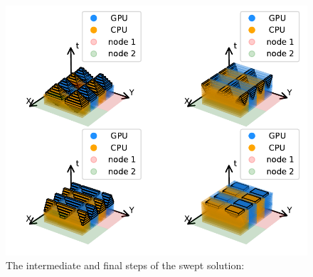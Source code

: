 \documentclass[journal,article,submit,moreauthors,pdftex]{Definitions/mdpi}
\newcommand\fs{1}
\begin{document}
\begin{figure}
    \widefigure
    \begin{center}
        \includegraphics[scale=\fs, trim={1cm 0.6cm 0.5cm 0cm},clip]{figs/SubsPlot2.pdf}
    \end{center}
    \caption{The intermediate and final steps of the swept solution: }
    \label{fig:MainTwo}
\end{figure}
\end{document}

